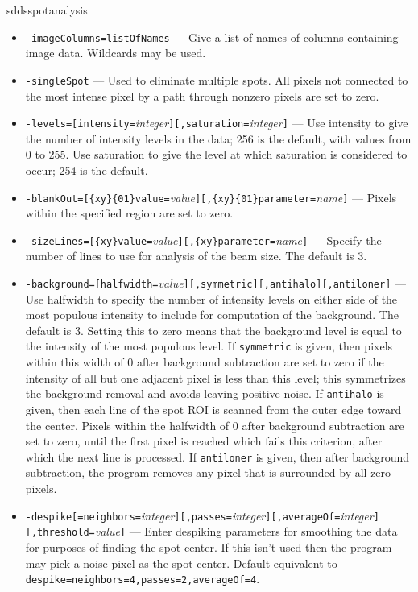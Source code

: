 \begin{sddsprog}{sddsspotanalysis}
\begin{itemize}
      \item \verb|-imageColumns=listOfNames| --- Give a list of names of columns containing image data. Wildcards may be used.
      \item \verb|-singleSpot| --- Used to eliminate multiple spots. All pixels not connected to the most intense pixel by a path through nonzero pixels are set to zero.
      \item \verb|-levels=[intensity=|{\em integer}\verb|][,saturation=|{\em integer}\verb|]| --- Use intensity to give the number of intensity levels in the data; 256 is the default, with values from 0 to 255. Use saturation to give the level at which saturation is considered to occur; 254 is the default.
      \item \verb|-blankOut=[{xy}{01}value=|{\em value}\verb|][,{xy}{01}parameter=|{\em name}\verb|]| --- Pixels within the specified region are set to zero.
      \item \verb|-sizeLines=[{xy}value=|{\em value}\verb|][,{xy}parameter=|{\em name}\verb|]| --- Specify the number of lines to use for analysis of the beam size. The default is 3.
      \item \verb|-background=[halfwidth=|{\em value}\verb|][,symmetric][,antihalo][,antiloner]| --- Use halfwidth to specify the number of intensity levels on either side of the most populous intensity to include for computation of the background. The default is 3. Setting this to zero means that the background level is equal to the intensity of the most populous level. If \verb|symmetric| is given, then pixels within this width of 0 after background subtraction are set to zero if the intensity of all but one adjacent pixel is less than this level; this symmetrizes the background removal and avoids leaving positive noise. If \verb|antihalo| is given, then each line of the spot ROI is scanned from the outer edge toward the center. Pixels within the halfwidth of 0 after background subtraction are set to zero, until the first pixel is reached which fails this criterion, after which the next line is processed. If \verb|antiloner| is given, then after background subtraction, the program removes any pixel that is surrounded by all zero pixels.
      \item \verb|-despike[=neighbors=|{\em integer}\verb|][,passes=|{\em integer}\verb|][,averageOf=|{\em integer}\verb|][,threshold=|{\em value}\verb|]| --- Enter despiking parameters for smoothing the data for purposes of finding the spot center. If this isn't used then the program may pick a noise pixel as the spot center. Default equivalent to \verb|-despike=neighbors=4,passes=2,averageOf=4|.

\end{itemize}
\end{sddsprog}
